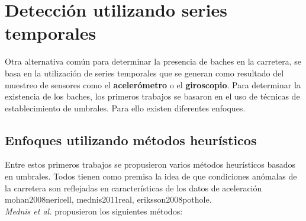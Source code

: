 





\section{Detección utilizando series temporales}
	Otra alternativa común para determinar la presencia de baches en la carretera, se basa en la utilización de series temporales que se generan como
	resultado del muestreo de sensores como el \textbf{acelerómetro} o el \textbf{giroscopio}. Para determinar la existencia de los baches, los primeros
	trabajos se basaron en el uso de técnicas de establecimiento de umbrales. Para ello existen diferentes enfoques.

	\subsection{Enfoques utilizando métodos heurísticos}
		Entre estos primeros trabajos se propusieron varios métodos heurísticos basados en umbrales. Todos tienen como premisa
		la idea de que condiciones anómalas de la carretera son reflejadas en características de los datos de aceleración\brackcite
		{mohan2008nericell, mednis2011real, eriksson2008pothole}.\\

		\emph{Mednis et al.} propusieron los siguientes métodos:\\

